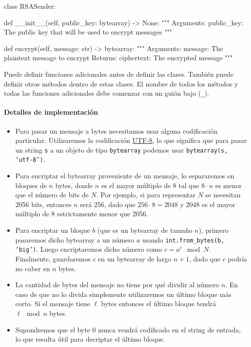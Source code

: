 \begin{python}
  class RSASender:
    
    def __init__(self, public_key: bytearray) -> None:
    """
    Arguments:
      public_key: The public key that will be used to encrypt messages
    """

    def encrypt(self, message: str) -> bytearray:
    """
    Arguments:
      message: The plaintext message to encrypt
    Returns:
      ciphertext: The encrypted message
    """
\end{python}

Puede definir funciones adicionales antes de definir las clases. También puede definir otros métodos dentro de estas clases. El nombre de todos los métodos y todas las funciones adicionales debe comenzar con un guión bajo (\texttt{\_}).

\paragraph{Detalles de implementación}
\begin{itemize}
  \item Para pasar un mensaje a bytes necesitamos usar alguna codificación particular. Utilizaremos la codificación \href{https://en.wikipedia.org/wiki/UTF-8}{UTF-8}, lo que significa que para pasar un string \texttt{s} a un objeto de tipo \texttt{bytearray} podemos usar \texttt{bytearray(s, 'utf-8')}.
  \item Para encriptar el bytearray proveniente de un mensaje, lo separaremos en bloques de $n$ bytes, donde $n$ es el mayor múltiplo de 8 tal que $8\cdot n$ es menor que el número de bits de $N$. Por ejemplo, si para representar $N$ se necesitan 2056 bits, entonces $n$ será 256, dado que $256\cdot 8=2048$ y 2048 es el mayor múltiplo de 8 estrictamente menor que 2056.
  \item Para encriptar un bloque $b$ (que es un bytearray de tamaño $n$), primero pasaremos dicho bytearray a un número $a$ usando \texttt{int.from\_bytes(b, 'big')}. Luego encriptaremos dicho número como $c=a^e\mod N$. Finalmente, guardaremos $c$ en un bytearray de largo $n+1$, dado que $c$ podría no caber en $n$ bytes.
  \item La cantidad de bytes del mensaje no tiene por qué dividir al número $n$. En caso de que no lo divida simplemente utilizaremos un último bloque más corto. Si el mensaje tiene $\ell$ bytes entonces el último bloque tendrá $\ell\mod n$ bytes.
  \item Supondremos que el byte 0 nunca vendrá codificado en el string de entrada, lo que resulta útil para decriptar el último bloque.
\end{itemize}

